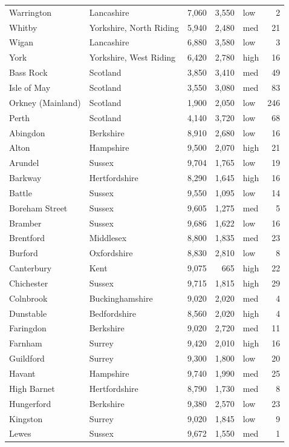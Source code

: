 \documentclass[11pt,a4paper]{article}
\begin{document}
{\begin{longtable}{p{5.4cm}p{4.2cm}rrlr}
Warrington & Lancashire & 7,060 & 3,550 & low & 2\\
Whitby & Yorkshire, North Riding & 5,940 & 2,480 & med & 21\\
Wigan & Lancashire & 6,880 & 3,580 & low & 3\\
York & Yorkshire, West Riding & 6,420 & 2,780 & high & 16\\
Bass Rock & Scotland & 3,850 & 3,410 & med & 49\\
Isle of May & Scotland & 3,550 & 3,080 & med & 83\\
Orkney (Mainland) & Scotland & 1,900 & 2,050 & low & 246\\
Perth & Scotland & 4,140 & 3,720 & low & 68\\
Abingdon & Berkshire & 8,910 & 2,680 & low & 16\\
Alton & Hampshire & 9,500 & 2,070 & high & 21\\
Arundel & Sussex & 9,704 & 1,765 & low & 19\\
Barkway & Hertfordshire & 8,290 & 1,645 & high & 16\\
Battle & Sussex & 9,550 & 1,095 & low & 14\\
Boreham Street & Sussex & 9,605 & 1,275 & med & 5\\
Bramber & Sussex & 9,686 & 1,622 & low & 16\\
Brentford & Middlesex & 8,800 & 1,835 & med & 23\\
Burford & Oxfordshire & 8,830 & 2,810 & low & 8\\
Canterbury & Kent & 9,075 & 665 & high & 22\\
Chichester & Sussex & 9,715 & 1,815 & high & 29\\
Colnbrook & Buckinghamshire & 9,020 & 2,020 & med & 4\\
Dunstable & Bedfordshire & 8,560 & 2,020 & high & 4\\
Faringdon & Berkshire & 9,020 & 2,720 & med & 11\\
Farnham & Surrey & 9,420 & 2,010 & high & 16\\
Guildford & Surrey & 9,300 & 1,800 & low & 20\\
Havant & Hampshire & 9,740 & 1,990 & med & 25\\
High Barnet & Hertfordshire & 8,790 & 1,730 & med & 8\\
Hungerford & Berkshire & 9,380 & 2,570 & low & 23\\
Kingston & Surrey & 9,020 & 1,845 & low & 9\\
Lewes & Sussex & 9,672 & 1,550 & med & 1\\

\end{longtable}}
\end{document}
